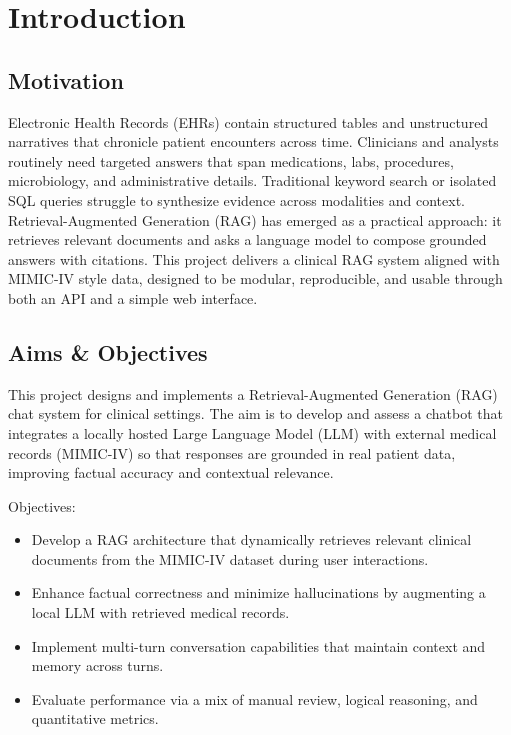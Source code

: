 \chapter{Introduction}

\section{Motivation}
Electronic Health Records (EHRs) contain structured tables and unstructured narratives that chronicle patient encounters across time. Clinicians and analysts routinely need targeted answers that span medications, labs, procedures, microbiology, and administrative details. Traditional keyword search or isolated SQL queries struggle to synthesize evidence across modalities and context. Retrieval-Augmented Generation (RAG) has emerged as a practical approach: it retrieves relevant documents and asks a language model to compose grounded answers with citations. This project delivers a clinical RAG system aligned with MIMIC-IV style data, designed to be modular, reproducible, and usable through both an API and a simple web interface.

\section{Aims \& Objectives}
This project designs and implements a Retrieval-Augmented Generation (RAG) chat system for clinical settings. The aim is to develop and assess a chatbot that integrates a locally hosted Large Language Model (LLM) with external medical records (MIMIC-IV) so that responses are grounded in real patient data, improving factual accuracy and contextual relevance.

\noindent Objectives:
\begin{itemize}
  \item Develop a RAG architecture that dynamically retrieves relevant clinical documents from the MIMIC-IV dataset during user interactions.
  \item Enhance factual correctness and minimize hallucinations by augmenting a local LLM with retrieved medical records.
  \item Implement multi-turn conversation capabilities that maintain context and memory across turns.
  \item Evaluate performance via a mix of manual review, logical reasoning, and quantitative metrics.
\end{itemize}

